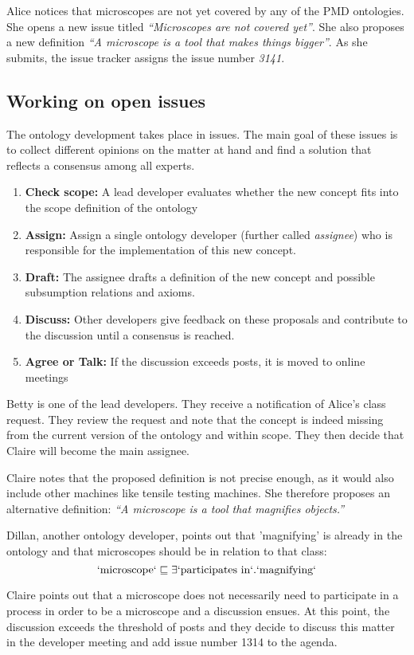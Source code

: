 \begin{example}
    Alice notices that microscopes are not yet covered by any of the PMD ontologies. She opens a new issue titled \textit{``Microscopes are not covered yet''}. She also proposes a new definition \textit{``A microscope is a tool that makes things bigger''}. As she submits, the issue tracker assigns the issue number \textit{3141}.
\end{example}

\subsection{Working on open issues}

The ontology development takes place in {\github} issues. The main goal of these issues is to collect different opinions on the matter at hand and find a solution that reflects a consensus among all experts.

\begin{enumerate}
    \item \textbf{Check scope: } A lead developer evaluates whether the new concept fits into the scope definition of the ontology
    \item \textbf{Assign:} Assign a single ontology developer (further called \textit{assignee}) who is responsible for the implementation of this new concept.
    \item \textbf{Draft:} The assignee drafts a definition of the new concept and possible subsumption relations and axioms.
    \item \textbf{Discuss:} Other developers give feedback on these proposals and contribute to the discussion until a consensus is reached.
    \item \textbf{Agree or Talk:} If the discussion exceeds {\issuediscussionlimit} posts, it is moved to online meetings
\end{enumerate}

\begin{example}
    Betty is one of the lead developers. They receive a notification of Alice's class request. They review the request and note that the concept is indeed missing from the current version of the ontology and within scope. They then decide that Claire will become the main assignee.

    Claire notes that the proposed definition is not precise enough, as it would also include other machines like tensile testing machines. She therefore proposes an alternative definition: \textit{``A microscope is a tool that magnifies objects.''}

    Dillan, another ontology developer, points out that 'magnifying' is already in the ontology and that microscopes should be in relation to that class: 
    \[\mathrm{`microscope`} \sqsubseteq \exists \mathrm{`participates~in`}.\mathrm{`magnifying`}\]

    Claire points out that a microscope does not necessarily need to participate in a process in order to be a microscope and a discussion ensues. At this point, the discussion exceeds the threshold of {\issuediscussionlimit} posts and they decide to discuss this matter in the developer meeting and add issue number 1314 to the agenda.
\end{example}


